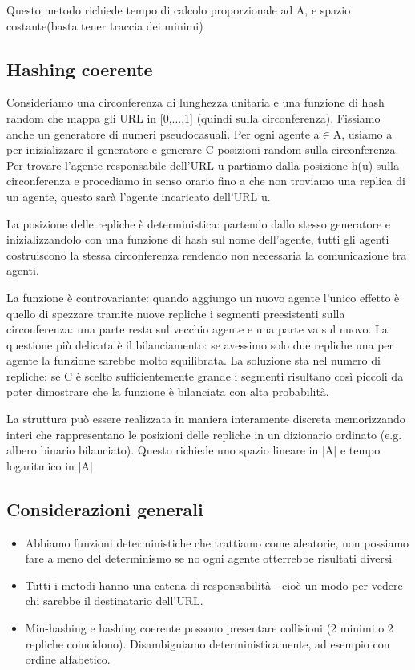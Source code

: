 \documentclass[12pt,italian]{report}
\begin{document}
Questo metodo richiede tempo di calcolo proporzionale ad A, e spazio costante(basta tener traccia dei minimi)

\subsection{Hashing coerente}
\label{Hashing coerente} 
Consideriamo una circonferenza di lunghezza unitaria e una funzione di hash random che mappa gli URL in [0,...,1] (quindi sulla circonferenza). Fissiamo anche un generatore di numeri pseudocasuali. 
Per ogni agente a$\in$A, usiamo a per inizializzare il generatore e generare C posizioni random sulla circonferenza. Per trovare l'agente responsabile dell'URL u partiamo dalla posizione h(u) sulla circonferenza e procediamo in senso orario fino a che non troviamo una replica di un agente, questo sarà l'agente incaricato dell'URL u. 

La posizione delle repliche è deterministica: partendo dallo stesso generatore e inizializzandolo con una funzione di hash sul nome dell'agente, tutti gli agenti costruiscono la stessa circonferenza rendendo non necessaria la comunicazione tra agenti. 

La funzione è controvariante: quando aggiungo un nuovo agente l'unico effetto è quello di spezzare tramite nuove repliche i segmenti preesistenti sulla circonferenza: una parte resta sul vecchio agente e una parte va sul nuovo.
La questione più delicata è il bilanciamento: se avessimo solo due repliche una per agente la funzione sarebbe molto squilibrata. La soluzione sta nel numero di repliche: se C è scelto sufficientemente grande i segmenti risultano così piccoli da poter dimostrare che la funzione è bilanciata con alta probabilità. 

La struttura può essere realizzata in maniera interamente discreta memorizzando interi che rappresentano le posizioni delle repliche in un dizionario ordinato (e.g. albero binario bilanciato).
Questo richiede uno spazio lineare in $|$A$|$ e tempo logaritmico in $|$A$|$

\subsection{Considerazioni generali}
\label{Considerazioni generali} 

\begin{itemize}
    \item Abbiamo funzioni deterministiche che trattiamo come aleatorie, non possiamo fare a meno del determinismo se no ogni agente otterrebbe risultati diversi
    \item Tutti i metodi hanno una catena di responsabilità - cioè un modo per vedere chi sarebbe il destinatario dell'URL. 
    \item Min-hashing e hashing coerente possono presentare collisioni (2 minimi o 2 repliche coincidono). Disambiguiamo deterministicamente, ad esempio con ordine alfabetico.
\end{itemize}
\end{document}
